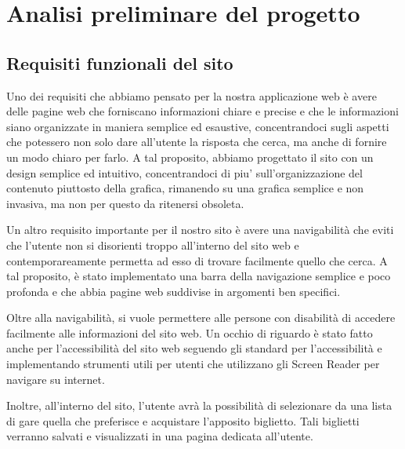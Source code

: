 \documentclass[12pt, a4paper]{article}
\begin{document}
\section{Analisi preliminare del progetto}

\subsection{Requisiti funzionali del sito}
Uno dei requisiti che abbiamo pensato per la nostra applicazione web è avere delle pagine web che forniscano informazioni chiare e precise e che le informazioni siano organizzate in maniera semplice ed esaustive, concentrandoci sugli aspetti che potessero
non solo dare all'utente la risposta che cerca, ma anche di fornire un modo chiaro per farlo. A tal proposito, abbiamo progettato il sito con un design semplice ed intuitivo, concentrandoci di piu' sull'organizzazione del contenuto piuttosto della grafica, rimanendo su una grafica semplice e non invasiva, ma
non per questo da ritenersi obsoleta.\par
Un altro requisito importante per il nostro sito è avere una navigabilità che eviti che l'utente non si disorienti troppo all'interno del sito web e contemporareamente permetta ad esso di trovare facilmente quello che cerca. A tal proposito, è stato implementato
una barra della navigazione semplice e poco profonda e che abbia pagine web suddivise in argomenti ben specifici.\par
Oltre alla navigabilità, si vuole permettere alle persone con disabilità di accedere facilmente alle informazioni del sito web. Un occhio di riguardo è stato fatto anche per l'accessibilità del sito web
seguendo gli standard per l'accessibilità e implementando strumenti utili per utenti che utilizzano gli Screen Reader per navigare su internet.\par
Inoltre, all'interno del sito, l'utente avrà la possibilità di selezionare da una lista di gare quella che preferisce e acquistare l'apposito biglietto. Tali biglietti verranno salvati e visualizzati in una pagina dedicata all'utente.\par
\end{document}
